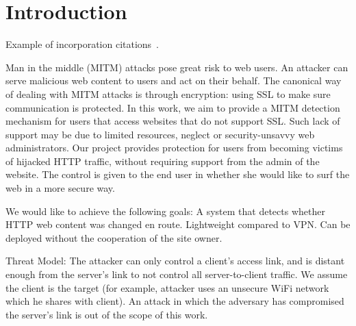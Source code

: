 \section{Introduction}
\label{sec:intro}

Example of incorporation citations~\cite{coral:nsdi04}.

Man in the middle (MITM) attacks pose great risk to web users. An attacker can serve malicious web content to users and act on their behalf. The canonical way of dealing with MITM attacks is through encryption: using SSL to make sure communication is protected. In this work, we aim to provide a MITM detection mechanism for users that access websites that do not support SSL. Such lack of support may be due to limited resources, neglect or security-unsavvy web administrators. Our project provides protection for users from becoming victims of hijacked HTTP traffic, without requiring support from the admin of the website. The control is given to the end user in whether she would like to surf the web in a more secure way.

We would like to achieve the following goals:
A system that detects whether HTTP web content was changed en route.
Lightweight compared to VPN.
Can be deployed without the cooperation of the site owner.

Threat Model:
The attacker can only control a client’s access link, and is distant enough from the server’s link to not control all server-to-client traffic. We assume the client is the target (for example, attacker uses an unsecure WiFi network which he shares with client).
An attack in which the adversary has compromised the server’s link is out of the scope of this work.
